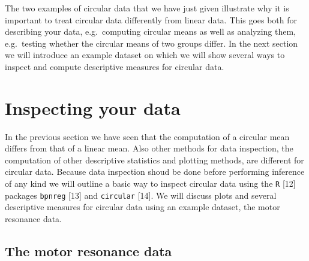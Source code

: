 \documentclass[11pt,]{article}
\begin{document}
The two examples of circular data that we have just given illustrate why
it is important to treat circular data differently from linear data.
This goes both for describing your data, e.g.~computing circular means
as well as analyzing them, e.g.~testing whether the circular means of
two groups differ. In the next section we will introduce an example
dataset on which we will show several ways to inspect and compute
descriptive measures for circular data.

\section{Inspecting your data}\label{DataInspection}

In the previous section we have seen that the computation of a circular
mean differs from that of a linear mean. Also other methods for data
inspection, the computation of other descriptive statistics and plotting
methods, are different for circular data. Because data inspection shoud
be done before performing inference of any kind we will outline a basic
way to inspect circular data using the \verb|R| {[}12{]} packages
\verb|bpnreg| {[}13{]} and \verb|circular| {[}14{]}. We will discuss
plots and several descriptive measures for circular data using an
example dataset, the motor resonance data.

\subsection{The motor resonance data}\label{regressionexample}
\end{document}
